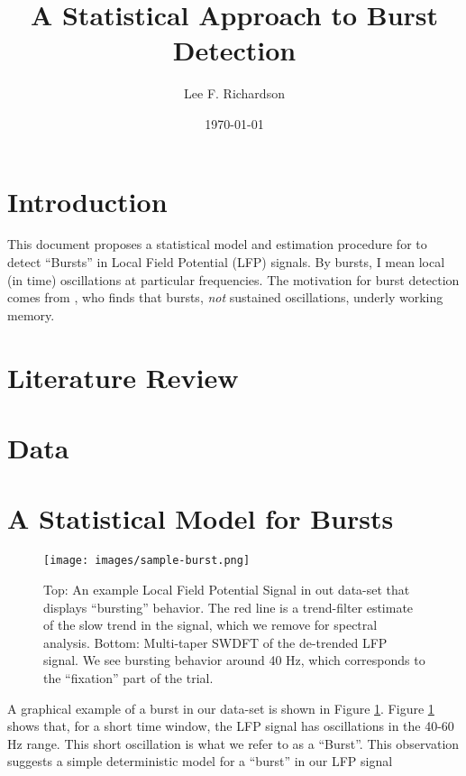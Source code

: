 \documentclass[11pt]{article}
\theoremstyle{plain}
\theoremstyle{definition}
\begin{document}
\title{{\Large A Statistical Approach to Burst Detection}}
\author{Lee F. Richardson}
\date{\today}
\maketitle

\section{Introduction}
This document proposes a statistical model and estimation procedure for to detect ``Bursts'' in Local Field Potential (LFP) signals. By bursts, I mean local (in time) oscillations at particular frequencies. The motivation for burst detection comes from \cite{lundqvist2016gamma}, who finds that bursts, {\it not} sustained oscillations, underly working memory. 

\section{Literature Review}
\label{sec:lit-review}

\section{Data}
\label{sec:data}

\section{A Statistical Model for Bursts}
\label{sec:model}

\begin{figure}[!ht]
  \centering
  \texttt{[image: images/sample-burst.png]}
  \caption{Top: An example Local Field Potential Signal in out data-set that displays ``bursting'' behavior. The red line is a trend-filter estimate of the slow trend in the signal, which we remove for spectral analysis. Bottom: Multi-taper SWDFT of the de-trended LFP signal. We see bursting behavior around 40 Hz, which corresponds to the ``fixation'' part of the trial.}
\label{fig:example-burst}
\end{figure}

A graphical example of a burst in our data-set is shown in Figure \ref{fig:example-burst}. Figure \ref{fig:example-burst} shows that, for a short time window, the LFP signal has oscillations in the 40-60 Hz range. This short oscillation is what we refer to as a ``Burst''. This observation suggests a simple deterministic model for a ``burst'' in our LFP signal
\end{document}
